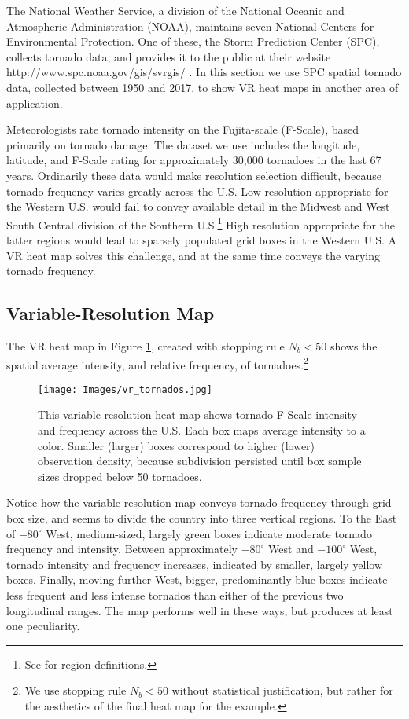 The National Weather Service, a division of the National Oceanic and Atmospheric Administration (NOAA), maintains seven National Centers for Environmental Protection. One of these, the Storm Prediction Center (SPC), collects tornado data, and provides it to the public at their website http://www.spc.noaa.gov/gis/svrgis/ \citep{NOAA}. In this section we use SPC spatial tornado data, collected between 1950 and 2017, to show VR heat maps in another area of application. 

Meteorologists rate tornado intensity on the Fujita-scale (F-Scale), based primarily on tornado damage. The dataset we use includes the longitude, latitude, and F-Scale rating for approximately 30,000 tornadoes in the last 67 years. Ordinarily these data would make resolution selection difficult, because tornado frequency varies greatly across the U.S. Low resolution appropriate for the Western U.S. would fail to convey available detail in the Midwest and West South Central division of the Southern U.S.\footnote{See \cite{regions} for region definitions.} High resolution appropriate for the latter regions would lead to sparsely populated grid boxes in the Western U.S. A VR heat map solves this challenge, and at the same time conveys the varying tornado frequency. 

\subsection{Variable-Resolution Map}

The VR heat map in Figure \ref{fig:tornado1}, created with stopping rule $N_{b} < 50$ shows the spatial average intensity, and relative frequency, of tornadoes.\footnote{We use stopping rule $N_{b} < 50$ without statistical justification, but rather for the aesthetics of the final heat map for the example.}
        \begin{figure}[H]
      	\centering      
      	\texttt{[image: Images/vr\_tornados.jpg]}
      	\caption{This variable-resolution heat map shows tornado F-Scale intensity and frequency across the U.S. Each box maps average intensity to a color. Smaller (larger) boxes correspond to higher (lower) observation density, because subdivision persisted until box sample sizes dropped below 50 tornadoes.}
      	\label{fig:tornado1}
        \end{figure}
Notice how the variable-resolution map conveys tornado frequency through grid box size, and seems to divide the country into three vertical regions. To the East of $-80^{\circ}$ West, medium-sized, largely green boxes indicate moderate tornado frequency and intensity. Between approximately $-80^{\circ}$ West and $-100^{\circ}$ West, tornado intensity and frequency increases, indicated by smaller, largely yellow boxes. Finally, moving further West, bigger, predominantly blue boxes indicate less frequent and less intense tornados than either of the previous two longitudinal ranges. The map performs well in these ways, but produces at least one peculiarity.

